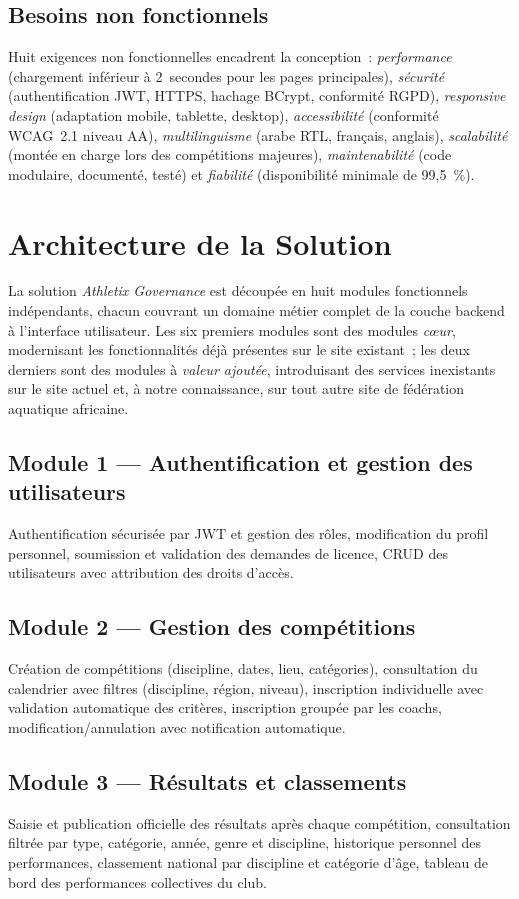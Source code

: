 \documentclass[conference]{IEEEtran}
\begin{document}
\subsection{Besoins non fonctionnels}
Huit exigences non fonctionnelles encadrent la conception~: \emph{performance} (chargement inférieur à 2~secondes pour les pages principales), \emph{sécurité} (authentification JWT, HTTPS, hachage BCrypt, conformité RGPD), \emph{responsive design} (adaptation mobile, tablette, desktop), \emph{accessibilité} (conformité WCAG~2.1 niveau AA), \emph{multilinguisme} (arabe RTL, français, anglais), \emph{scalabilité} (montée en charge lors des compétitions majeures), \emph{maintenabilité} (code modulaire, documenté, testé) et \emph{fiabilité} (disponibilité minimale de 99,5~\%).

\section{Architecture de la Solution}
La solution \emph{Athletix Governance} est découpée en huit modules fonctionnels indépendants, chacun couvrant un domaine métier complet de la couche backend à l'interface utilisateur. Les six premiers modules sont des modules \emph{cœur}, modernisant les fonctionnalités déjà présentes sur le site existant~; les deux derniers sont des modules à \emph{valeur ajoutée}, introduisant des services inexistants sur le site actuel et, à notre connaissance, sur tout autre site de fédération aquatique africaine.

\subsection{Module 1 — Authentification et gestion des utilisateurs}
Authentification sécurisée par JWT et gestion des rôles, modification du profil personnel, soumission et validation des demandes de licence, CRUD des utilisateurs avec attribution des droits d'accès.

\subsection{Module 2 — Gestion des compétitions}
Création de compétitions (discipline, dates, lieu, catégories), consultation du calendrier avec filtres (discipline, région, niveau), inscription individuelle avec validation automatique des critères, inscription groupée par les coachs, modification/annulation avec notification automatique.

\subsection{Module 3 — Résultats et classements}
Saisie et publication officielle des résultats après chaque compétition, consultation filtrée par type, catégorie, année, genre et discipline, historique personnel des performances, classement national par discipline et catégorie d'âge, tableau de bord des performances collectives du club.
\end{document}
